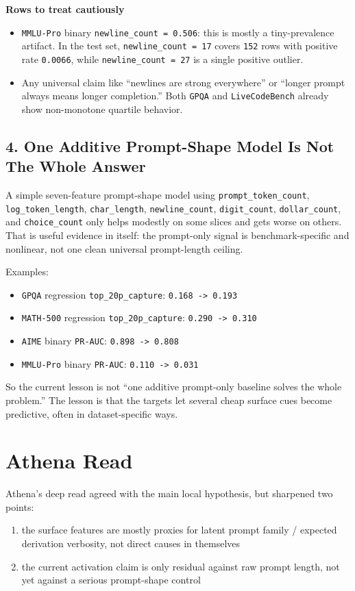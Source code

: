 \documentclass[11pt]{article}
\begin{document}
\textbf{Rows to treat cautiously}
\begin{itemize}[leftmargin=1.5em]
\item \texttt{MMLU-Pro} binary \texttt{newline\_count = 0.506}: this is mostly a tiny-prevalence artifact. In the test set, \texttt{newline\_count = 17} covers \texttt{152} rows with positive rate \texttt{0.0066}, while \texttt{newline\_count = 27} is a single positive outlier.
\item Any universal claim like ``newlines are strong everywhere'' or ``longer prompt always means longer completion.'' Both \texttt{GPQA} and \texttt{LiveCodeBench} already show non-monotone quartile behavior.
\end{itemize}

\subsection*{4. One Additive Prompt-Shape Model Is Not The Whole Answer}
A simple seven-feature prompt-shape model using \texttt{prompt\_token\_count}, \texttt{log\_token\_length}, \texttt{char\_length}, \texttt{newline\_count}, \texttt{digit\_count}, \texttt{dollar\_count}, and \texttt{choice\_count} only helps modestly on some slices and gets worse on others. That is useful evidence in itself: the prompt-only signal is benchmark-specific and nonlinear, not one clean universal prompt-length ceiling.

Examples:
\begin{itemize}[leftmargin=1.5em]
\item \texttt{GPQA} regression \texttt{top\_20p\_capture}: \texttt{0.168 -> 0.193}
\item \texttt{MATH-500} regression \texttt{top\_20p\_capture}: \texttt{0.290 -> 0.310}
\item \texttt{AIME} binary \texttt{PR-AUC}: \texttt{0.898 -> 0.808}
\item \texttt{MMLU-Pro} binary \texttt{PR-AUC}: \texttt{0.110 -> 0.031}
\end{itemize}

So the current lesson is not ``one additive prompt-only baseline solves the whole problem.'' The lesson is that the targets let several cheap surface cues become predictive, often in dataset-specific ways.

\section*{Athena Read}
Athena's deep read agreed with the main local hypothesis, but sharpened two points:
\begin{enumerate}[leftmargin=1.5em]
\item the surface features are mostly proxies for latent prompt family / expected derivation verbosity, not direct causes in themselves
\item the current activation claim is only residual against raw prompt length, not yet against a serious prompt-shape control
\end{enumerate}
\end{document}
